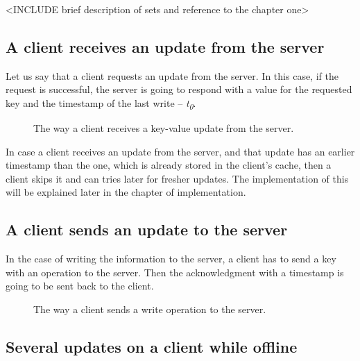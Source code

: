 <INCLUDE brief description of sets and reference to the chapter one>



\subsection{A client receives an update from the server}

Let us say that a client requests an update from the server. In this case, if the request is successful, the server is going to respond with a value for the requested key and the timestamp of the last write -- \textit{t\textsubscript{0}}.

\begin{figure}[!htb]
    \begin{center}
    \def\svgwidth{\linewidth}
    
    \caption {The way a client receives a key-value update from the server.}
    \label{fig:design2}
\end{center}
\end{figure}

In case a client receives an update from the server, and that update has an earlier timestamp than the one, which is already stored in the client's cache, then a client skips it and can tries later for fresher updates. The implementation of this will be explained later in the chapter of implementation.

\subsection{A client sends an update to the server}

In the case of writing the information to the server, a client has to send a key with an operation to the server. Then the acknowledgment with a timestamp is going to be sent back to the client.

\begin{figure}[!htb]
    \begin{center}
    \def\svgwidth{\linewidth}
    
    \caption {The way a client sends a write operation to the server.}
    \label{fig:design3}
\end{center}
\end{figure}

\subsection*{Several updates on a client while offline}


